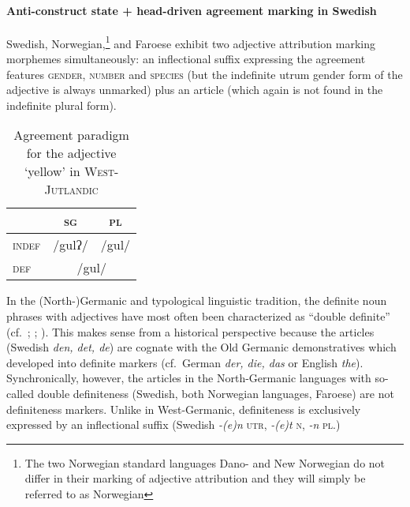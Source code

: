 \paragraph{Anti-construct state + head-driven agreement marking in Swedish}\label{swedish synchr}
Swe\-dish, Norwegian,\footnote{The two Norwegian standard languages Dano- and New Norwegian do not differ in their marking of adjective attribution and they will simply be referred to as Norwegian} and Faroese exhibit two adjective attribution marking morphemes simultaneously: an inflectional suffix expressing the agreement features \textsc{gender}, \textsc{number} and \textsc{species} (but the indefinite utrum gender form of the adjective is always unmarked) plus an article (which again is not found in the indefinite plural form).

\begin{table}
\begin{center}
\begin{footnotesize}
\begin{tabular}[h]{l|cc}
\hline
\hline
		& \textsc{sg}	&\textsc{pl}\\
\hline
\textsc{indef}	&/gulʔ/	 	&/gul/\\ 	
\textsc{def}	&\multicolumn{2}{c}{/gul/}\\
\hline
\hline
\end{tabular}
\caption[Adjective paradigm for \textsc{West-Jutlandic}]{Agreement paradigm for the adjective ‘yellow’ in \textsc{West-Jutlandic} \cite{ringgaard1960}}\label{jutl agr paradigm}
\end{footnotesize}
\end{center}
\end{table}

In the (North-)Germanic and typological linguistic tradition, the definite noun phrases with adjectives have most often been characterized as “double definite” (cf.~\citealt{borjars1994}; \citealt{julien2003}; \citealt[354–355]{plank2003}). This makes sense from a historical perspective because the articles (Swedish \textit{den, det, de}) are cognate with the Old Germanic demonstratives which developed into definite markers (cf.~German \textit{der, die, das} or English \textit{the}). Synchronically, however, the articles in the North-Germanic languages with so-called double definiteness (Swedish, both Norwegian languages, Faroese) are not definiteness markers. Unlike in West-Germanic, definiteness is exclusively expressed by an inflectional suffix (Swedish \textit{-(e)n} \textsc{utr}, \textit{-(e)t} \textsc{n}, \textit{-n} \textsc{pl}.)

